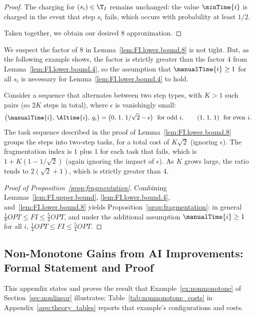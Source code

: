 \begin{proof}
    The charging for $(s_i) \in \T_I$ remains unchanged: the value $\minTime{i}$ is charged in the event that step $s_i$ fails, which occurs with probability at least $1/2$.

    Taken together, we obtain our desired $8$ approximation.
\end{proof}

We suspect the factor of $8$ in Lemma~\ref{lem:FI.lower.bound.8} is not tight.
But, as the following example shows, the factor is strictly greater than the factor $4$ from Lemma~\ref{lem:FI.lower.bound.4}, so the assumption that $\manualTime{i} \geq 1$ for all $s_i$ is necessary for Lemma~\ref{lem:FI.lower.bound.4} to hold.

\begin{example}
\label{ex:FI.necessity}
Consider a sequence that alternates between two step types, with $K > 1$ such pairs (so $2K$ steps in total), where $\epsilon$ is vanishingly small:
\[ \bigl(\manualTime{i},\, \AItime{i},\, q_i\bigr) = \bigl(0,\, 1,\, 1/\sqrt{2}-\epsilon\bigr) \ \text{ for odd $i$}, \qquad (1,\,1,\,1) \ \text{ for even $i$}. \]
The task sequence described in the proof of Lemma~\ref{lem:FI.lower.bound.8} groups the steps into two-step tasks, for a total cost of $K \sqrt{2}$ (ignoring $\epsilon$).
The fragmentation index is $1$ plus $1$ for each task that fails, which is $1 + K(1 - 1/\sqrt{2})$ (again ignoring the impact of $\epsilon$).
As $K$ grows large, the ratio tends to $2(\sqrt{2}+1)$, which is strictly greater than $4$.
\end{example}

\begin{proof}[Proof of Proposition~\ref{prop:fragmentation}]
Combining Lemmas~\ref{lem:FI.upper.bound}, \ref{lem:FI.lower.bound.4}, and~\ref{lem:FI.lower.bound.8} yields Proposition~\ref{prop:fragmentation}: in general $\tfrac{1}{8}OPT \leq FI \leq \tfrac{5}{4}OPT$, and under the additional assumption $\manualTime{i} \geq 1$ for all $i$, $\tfrac{1}{4}OPT \leq FI \leq \tfrac{5}{4}OPT$.
\end{proof}

\subsection{Non-Monotone Gains from AI Improvements: Formal Statement and Proof}
\label{app:nonmonotone}

This appendix states and proves the result that Example~\ref{ex:nonmonotone} of Section~\ref{sec:nonlinear} illustrates; Table~\ref{tab:nonmonotone_costs} in Appendix~\ref{app:theory_tables} reports that example's configurations and costs.

